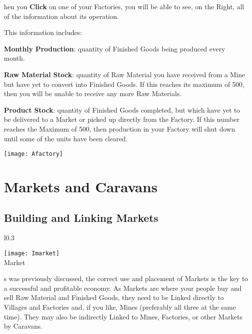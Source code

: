 hen you \textbf{Click} on one of your Factories, you will be able to see, on the Right, all of the information about its operation.

This information includes:

\textbf{Monthly Production}: quantity of Finished Goods being produced every month.

\textbf{Raw Material Stock}: quantity of Raw Material you have received from a Mine but have yet to convert into Finished Goods. If this reaches its maximum of 500, then you will be unable to receive any more Raw Materials.

\textbf{Product Stock}: quantity of Finished Goods completed, but which have yet to be delivered to a Market or picked up directly from the Factory. If this number reaches the Maximum of 500, then production in your Factory will shut down until some of the units have been cleared.

\begin{center}
    \texttt{[image: Afactory]} %
\end{center}

\section{\textsf{Markets and Caravans}}


\subsection{\textsf{Building and Linking Markets}}


\begin{wrapfigure}{l}{0.3\textwidth}
    \vspace{-20pt}
    \begin{center}
        \texttt{[image: Imarket]} %
        \\ Market
    \end{center}
    \vspace{-30pt} %
\end{wrapfigure}


s was previously discussed, the correct use and placement of Markets is the key to a successful and profitable economy. As Markets are where your people buy and sell Raw Material and Finished Goods, they need to be Linked directly to Villages and Factories and, if you like, Mines (preferably all three at the same time). They may also be indirectly Linked to Mines, Factories, or other Markets by Caravans.

